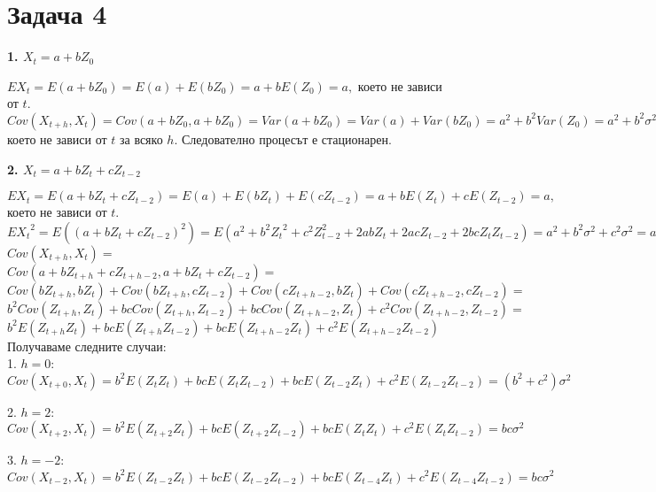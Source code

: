 \documentclass{article}
\begin{document}
\section*{Задача 4}
\begin{flushleft}

\textbf{1. $X_t = a + bZ_0$}
\begin{flushleft}
$EX_t = E(a + bZ_0) = E(a) + E(bZ_0) = a + bE(Z_0) = a,$ което не зависи от $t$. \\
$Cov(X_{t+h}, X_t) = Cov(a + bZ_0, a + bZ_0) = Var(a + bZ_0) = Var(a) + Var(bZ_0) = a^2 + b^2Var(Z_0) = a^2 + b^2 \sigma^2,$ което не зависи от $t$ за всяко $h$. Следователно процесът е стационарен. 
\end{flushleft}

\textbf{2. $X_t = a + bZ_t + cZ_{t-2}$}
\begin{flushleft}
$EX_t = E(a + bZ_t + cZ_{t-2}) = E(a) + E(bZ_t) + E(cZ_{t-2}) = a + bE(Z_t) + cE(Z_{t-2}) = a,$ което не зависи от $t$. \\

$E{X_t}^2 = E((a + bZ_t + cZ_{t-2})^2) = E(a^2 + b^2{Z_t}^2 + c^2{Z_{t-2}^2} + 2abZ_t + 2acZ_{t-2} + 2bcZ_tZ_{t-2}) = a^2 + b^2\sigma^2 + c^2\sigma^2 = a^2 + (b^2 + c^2)\sigma^2 < \infty$\\

$Cov(X_{t+h}, X_t) = $ \\ 
$Cov(a + bZ_{t+h} + cZ_{t+h-2}, a + bZ_t + cZ_{t-2}) = $ \\
$Cov(bZ_{t+h}, bZ_{t}) +Cov(bZ_{t+h}, cZ_{t-2}) + Cov(cZ_{t+h-2}, bZ_t) + Cov(cZ_{t+h-2}, cZ_{t-2}) =$ \\ 
$b^2Cov(Z_{t+h}, Z_t) + bcCov(Z_{t+h}, Z_{t-2}) + bcCov(Z_{t+h-2}, Z_t) + c^2Cov(Z_{t+h-2}, Z_{t-2}) =$ \\
$b^2E(Z_{t+h}Z_t) + bcE(Z_{t+h}Z_{t-2}) + bcE(Z_{t+h-2}Z_t) + c^2E(Z_{t+h-2}Z_{t-2})$ \\

Получаваме следните случаи: \\
1. $h = 0$: \\
$Cov(X_{t+0}, X_t) = b^2E(Z_{t}Z_t) + bcE(Z_{t}Z_{t-2}) + bcE(Z_{t-2}Z_t) + c^2E(Z_{t-2}Z_{t-2}) = (b^2 + c^2)\sigma^2$

2. $h = 2$: \\
$Cov(X_{t+2}, X_t) = b^2E(Z_{t+2}Z_t) + bcE(Z_{t+2}Z_{t-2}) + bcE(Z_{t}Z_t) + c^2E(Z_{t}Z_{t-2}) = bc\sigma^2$

3. $h = -2$: \\
$Cov(X_{t-2}, X_t) = b^2E(Z_{t-2}Z_t) + bcE(Z_{t-2}Z_{t-2}) + bcE(Z_{t-4}Z_t) + c^2E(Z_{t-4}Z_{t-2}) = bc\sigma^2$


\end{flushleft}
\end{flushleft}
\end{document}
